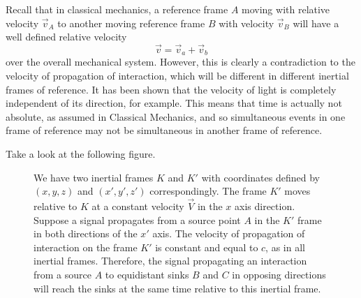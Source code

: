 \documentclass{article}
\begin{document}
			Recall that in classical mechanics, a reference frame $A$ moving with relative velocity $\vec{v}_A$ to another moving reference frame $B$ with velocity $\vec{v}_B$ will have a well defined relative velocity
			$$ \vec{v} = \vec{v}_a + \vec{v}_b$$
			over the overall mechanical system. However, this is clearly a contradiction to the velocity of propagation of interaction, which will be different in different inertial frames of reference. It has been shown that the velocity of light is completely independent of its direction, for example. This means that time is actually not absolute, as assumed in Classical Mechanics, and so simultaneous events in one frame of reference may not be simultaneous in another frame of reference.
			\begin{exmp}
				Take a look at the following figure.
				\begin{figure}[h]
					\begin{subfigure}{0.4\textwidth}
						\center
					\end{subfigure}
					\hfill
					\begin{minipage}{0.56\columnwidth}
						\begin{spacing}{1.5}
							We have two inertial frames $K$ and $K'$ with coordinates defined by $(x,y,z)$ and $(x',y',z')$ correspondingly. The frame $K'$ moves relative to $K$ at a constant velocity $\vec{V}$ in the $x$ axis direction. Suppose a signal propagates from a source point $A$ in the $K'$ frame in both directions of the $x'$ axis. The velocity of propagation of interaction on the frame $K'$ is constant and equal to $c$, as in all inertial frames. Therefore, the signal propagating an interaction from a source $A$ to equidistant sinks $B$ and $C$ in opposing directions will reach the sinks at the same time relative to this inertial frame.
						\end{spacing}
					\end{minipage}
				\end{figure}
				

\end{exmp}
\end{document}
